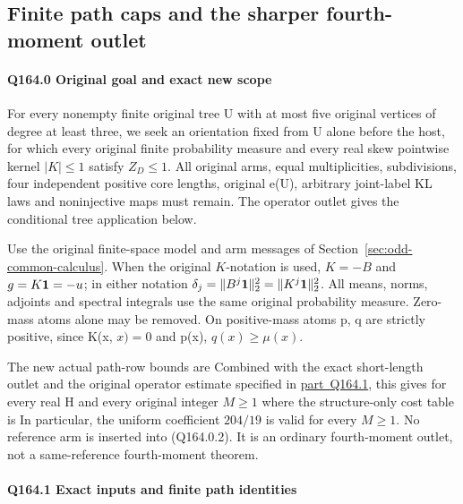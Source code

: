 \subsection{Finite path caps and the sharper fourth-moment outlet}\label{proof:Q5-C164}
\paragraph{Q164.0 Original goal and exact new scope}

For every nonempty finite original tree U with at most five original
vertices of degree at least three, we seek an orientation fixed
from U alone before the host, for which every original finite probability
measure and every real skew pointwise kernel \(|K|\le 1\) satisfy \(Z_D\le 1.\)
All original arms, equal multiplicities, subdivisions, four independent
positive core lengths, original e(U), arbitrary joint-label KL laws and
noninjective maps must remain. The operator outlet gives the conditional tree application below.

Use the original finite-space model and arm messages of
Section~\ref{sec:odd-common-calculus}.
When the original \(K\)-notation is used, \(K=-B\) and
\(g=K\mathbf1=-u\); in either notation
\(\delta_j=\|B^j\mathbf1\|_2^2=\|K^j\mathbf1\|_2^2\).
All means, norms, adjoints and spectral integrals use the same
original probability measure.
Zero-mass atoms alone may be removed. On positive-mass atoms p, q are
strictly positive, since K(x, \(x)=0\) and p(x), \(q(x)\ge \mu(x).\)


The new actual path-row bounds are
Combined with the exact short-length outlet and the original
operator estimate specified in \mbox{\hyperref[part:Q164.1]{part Q164.1}}, this gives for every real H
and every original integer \(M\ge 1\)
where the structure-only cost table is
In particular, the uniform coefficient \(204/19\) is valid for every \(M\ge 1.\)
No reference arm is inserted into (Q164.0.2). It is an ordinary fourth-moment
outlet, not a same-reference fourth-moment theorem.

\paragraph{Q164.1 Exact inputs and finite path identities}\label{part:Q164.1}

